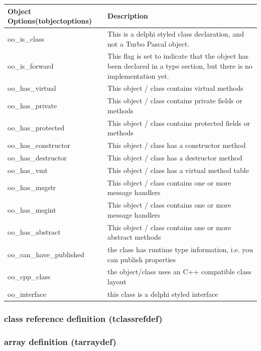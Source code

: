 \documentclass [12pt]{article}
\begin{document}
\begin{longtable}{|l|p{10cm}|}
\hline
Object Options(tobjectoptions) & Description \\
\hline
\endhead
\hline
\endfoot
\textsf{oo{\_}is{\_}class}& 
	This is a delphi styled class declaration, and not a Turbo Pascal
	object. \\
\textsf{oo{\_}is{\_}forward}& 
	This flag is set to indicate that the object has been declared in a
	type section, but there is no implementation yet. \\
\textsf{oo{\_}has{\_}virtual}& 
	This object / class contains virtual methods \\
\textsf{oo{\_}has{\_}private}& 
	This object / class contains private fields or methods \\
\textsf{oo{\_}has{\_}protected}& 
	This object / class contains protected fields or methods \\
\textsf{oo{\_}has{\_}constructor}& 
	This object / class has a constructor method \\
\textsf{oo{\_}has{\_}destructor}& 
	This object / class has a destructor method \\
\textsf{oo{\_}has{\_}vmt}& 
	This object / class has a virtual method table \\
\textsf{oo{\_}has{\_}msgstr}& 
	This object / class contains one or more message handlers  \\
\textsf{oo{\_}has{\_}msgint}& 
	This object / class contains one or more message handlers  \\
\textsf{oo{\_}has{\_}abstract}& 
	This object / class contains one or more abstract methods \\
\textsf{oo{\_}can{\_}have{\_}published}& 
	the class has runtime type information, i.e. you can publish
	properties \\
\textsf{oo{\_}cpp{\_}class}& 
	the object/class uses an C++ compatible class layout \\
\textsf{oo{\_}interface}& 
	this class is a delphi styled interface 
\end{longtable}

\subsubsection{class reference definition (tclassrefdef)}
\label{subsubsec:class}

\subsubsection{array definition (tarraydef)}
\label{subsubsec:array}
\end{document}

